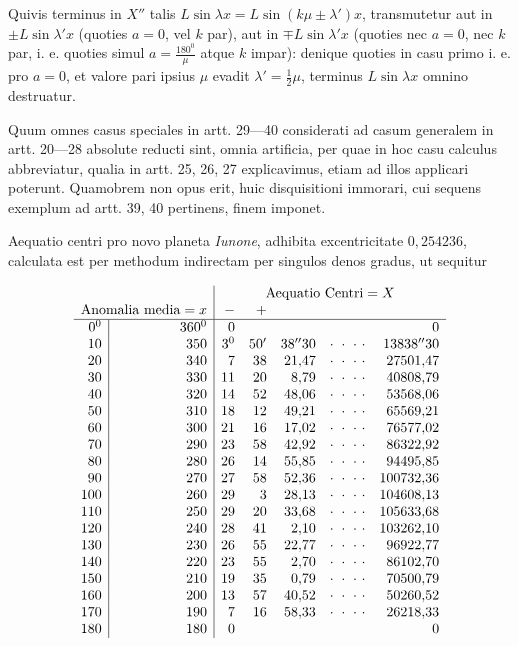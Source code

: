 Quivis terminus in $X''$ talis $L\sin\lambda x=L\sin(k\mu\pm\lambda')x$,
transmutetur aut in $\pm L\sin\lambda'x$ (quoties $a=0$, vel $k$ par),
aut in $\mp L\sin\lambda'x$ (quoties nec $a=0$, nec $k$ par,
i. e. quoties simul $a=\frac{180^0}{\mu}$ atque $k$ impar):
denique quoties in casu
primo i. e. pro \(a=0\), et valore pari ipsius \(\mu\) evadit \(\lambda'=\frac12\mu\), terminus \(L\sin\lambda x\) omnino destruatur.


Quum omnes casus speciales in artt. 29---40 considerati ad casum generalem in artt. 20---28 absolute reducti sint, omnia artificia, per quae in hoc casu calculus abbreviatur, qualia in artt. 25, 26, 27 explicavimus, etiam ad illos applicari poterunt. Quamobrem non opus erit, huic disquisitioni immorari, cui sequens exemplum ad artt. 39, 40 pertinens, finem imponet.

Aequatio centri pro novo planeta \textit{Iunone}, adhibita excentricitate \(0{,}254236\), calculata est per methodum indirectam per singulos denos gradus, ut sequitur

\[
\begin{array}{r|r|rrrcr}
\multicolumn{2}{c|}{}&
\multicolumn{5}{c}{\text{Aequatio Centri}=X}\\
\multicolumn{2}{r|}{\text{Anomalia media}=x}&-&+&&&\\ \hline
0^{\mathord{0}}&360^{\mathord{0}}&0&&&&0\\
10&350&3^{\mathord{0}}&50'&38''30&\cdot\ \cdot\ \cdot\ \cdot&13838''30\\
20&340&7&38&21{,}47&\cdot\ \cdot\ \cdot\ \cdot&27501{,}47\\
30&330&11&20&8{,}79&\cdot\ \cdot\ \cdot\ \cdot&40808{,}79\\
40&320&14&52&48{,}06&\cdot\ \cdot\ \cdot\ \cdot&53568{,}06\\
50&310&18&12&49{,}21&\cdot\ \cdot\ \cdot\ \cdot&65569{,}21\\
60&300&21&16&17{,}02&\cdot\ \cdot\ \cdot\ \cdot&76577{,}02\\
70&290&23&58&42{,}92&\cdot\ \cdot\ \cdot\ \cdot&86322{,}92\\
80&280&26&14&55{,}85&\cdot\ \cdot\ \cdot\ \cdot&94495{,}85\\
90&270&27&58&52{,}36&\cdot\ \cdot\ \cdot\ \cdot&100732{,}36\\
100&260&29&3&28{,}13&\cdot\ \cdot\ \cdot\ \cdot&104608{,}13\\
110&250&29&20&33{,}68&\cdot\ \cdot\ \cdot\ \cdot&105633{,}68\\
120&240&28&41&2{,}10&\cdot\ \cdot\ \cdot\ \cdot&103262{,}10\\
130&230&26&55&22{,}77&\cdot\ \cdot\ \cdot\ \cdot&96922{,}77\\
140&220&23&55&2{,}70&\cdot\ \cdot\ \cdot\ \cdot&86102{,}70\\
150&210&19&35&0{,}79&\cdot\ \cdot\ \cdot\ \cdot&70500{,}79\\
160&200&13&57&40{,}52&\cdot\ \cdot\ \cdot\ \cdot&50260{,}52\\
170&190&7&16&58{,}33&\cdot\ \cdot\ \cdot\ \cdot&26218{,}33\\
180&180&0&&&&0
\end{array}
\]

